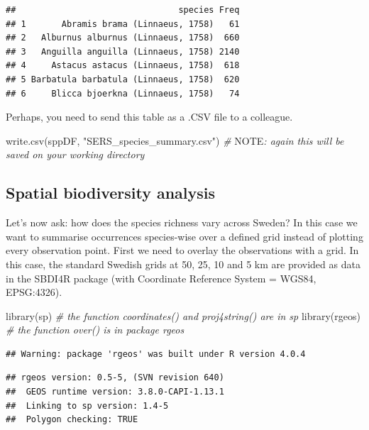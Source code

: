 \documentclass[
  10pt,
]{article}
\newenvironment{Shaded}{\begin{snugshade}}{\end{snugshade}}
\newcommand{\AlertTok}[1]{\textcolor[rgb]{0.94,0.16,0.16}{#1}}
\newcommand{\CommentTok}[1]{\textcolor[rgb]{0.56,0.35,0.01}{\textit{#1}}}
\newcommand{\FunctionTok}[1]{\textcolor[rgb]{0.00,0.00,0.00}{#1}}
\newcommand{\NormalTok}[1]{#1}
\newcommand{\StringTok}[1]{\textcolor[rgb]{0.31,0.60,0.02}{#1}}
\begin{document}
\begin{verbatim}
##                                species Freq
## 1       Abramis brama (Linnaeus, 1758)   61
## 2   Alburnus alburnus (Linnaeus, 1758)  660
## 3   Anguilla anguilla (Linnaeus, 1758) 2140
## 4     Astacus astacus (Linnaeus, 1758)  618
## 5 Barbatula barbatula (Linnaeus, 1758)  620
## 6     Blicca bjoerkna (Linnaeus, 1758)   74
\end{verbatim}

Perhaps, you need to send this table as a .CSV file to a colleague.

\begin{Shaded}
\begin{Highlighting}[]
\FunctionTok{write.csv}\NormalTok{(sppDF, }\StringTok{"SERS\_species\_summary.csv"}\NormalTok{)}
\CommentTok{\# }\AlertTok{NOTE}\CommentTok{: again this will be saved on your working directory}
\end{Highlighting}
\end{Shaded}

\hypertarget{spatial-biodiversity-analysis}{%
\subsection{Spatial biodiversity analysis}\label{spatial-biodiversity-analysis}}

Let's now ask: how does the species richness vary across Sweden? In this case we
want to summarise occurrences species-wise over a defined grid instead of plotting
every observation point. First we need to overlay the observations with a grid.
In this case, the standard Swedish grids at 50, 25, 10 and 5 km are provided as
data in the SBDI4R package (with Coordinate Reference System = WGS84, EPSG:4326).

\begin{Shaded}
\begin{Highlighting}[]
\FunctionTok{library}\NormalTok{(sp) }\CommentTok{\# the function coordinates() and proj4string() are in sp}
\FunctionTok{library}\NormalTok{(rgeos) }\CommentTok{\# the function over() is in package rgeos}
\end{Highlighting}
\end{Shaded}

\begin{verbatim}
## Warning: package 'rgeos' was built under R version 4.0.4
\end{verbatim}

\begin{verbatim}
## rgeos version: 0.5-5, (SVN revision 640)
##  GEOS runtime version: 3.8.0-CAPI-1.13.1 
##  Linking to sp version: 1.4-5 
##  Polygon checking: TRUE
\end{verbatim}
\end{document}
